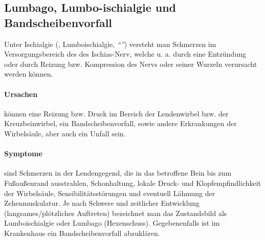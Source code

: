


\subsection{Lumbago, Lumbo-ischialgie und Bandscheibenvorfall} 

Unter Ischialgie (, Lumboischialgie,
\emph{"`"'}) versteht man Schmerzen im
Versorgungsbereich des des Ischias-Nerv, welche u. a. durch eine Entzündung oder durch Reizung bzw. Kompression des Nervs oder seiner
Wurzeln verursacht werden können. 

\paragraph{Ursachen} können eine Reizung bzw. Druck
im Bereich der Lendenwirbel bzw. der Kreuzbeinwirbel,
ein Bandscheibenvorfall, sowie andere Erkrankungen der Wirbelsäule, aber auch ein Unfall sein. 

\paragraph{Symptome} sind Schmerzen in der
Lendengegend, die in das betroffene Bein bis zum Fußaußenrand ausstrahlen, 
Schonhaltung, lokale Druck- und Klopfempfindlichkeit der Wirbelsäule,
Sensibilitätsstörungen und eventuell Lähmung der Zehenmuskulatur. Je nach
Schwere und zeitlicher Entwicklung (langsames/plötzliches Auftreten) bezeichnet
man das Zustandsbild als Lumboischialgie oder Lumbago (Hexenschuss). 
Gegebenenfalls ist im Krankenhaus ein Bandscheibenvorfall abzuklären.




